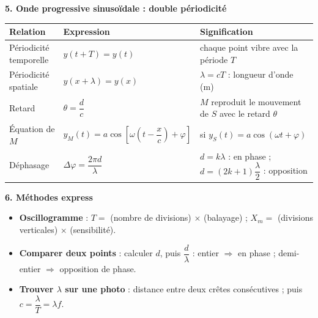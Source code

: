 \documentclass[11pt]{article}
\begin{document}
\begin{bilan}
\textbf{5. Onde progressive sinusoïdale : double périodicité}
\begin{center}
\begin{tabularx}{\linewidth}{|l|X|X|}\hline
\rowcolor{popblueL} \textbf{Relation} & \textbf{Expression} & \textbf{Signification} \\ \hline
Périodicité temporelle & $y(t+T)=y(t)$ & chaque point vibre avec la période $T$ \\ \hline
Périodicité spatiale & $y(x+\lambda)=y(x)$ & $\lambda=cT$ : longueur d'onde (m) \\ \hline
Retard & $\theta=\dfrac{d}{c}$ & $M$ reproduit le mouvement de $S$ avec le retard $\theta$ \\ \hline
Équation de $M$ & $y_M(t)=a\cos\left[\omega\left(t-\dfrac{x}{c}\right)+\varphi\right]$ & si $y_S(t)=a\cos(\omega t+\varphi)$ \\ \hline
Déphasage & $\Delta\varphi=\dfrac{2\pi d}{\lambda}$ & $d=k\lambda$ : en phase ; $d=(2k+1)\dfrac{\lambda}{2}$ : opposition \\ \hline
\end{tabularx}
\end{center}

\textbf{6. Méthodes express}
\begin{itemize}
  \item \textbf{Oscillogramme} : $T=$ (nombre de divisions) $\times$ (balayage) ; $X_m=$ (divisions verticales) $\times$ (sensibilité).
  \item \textbf{Comparer deux points} : calculer $d$, puis $\dfrac{d}{\lambda}$ : entier $\Rightarrow$ en phase ; demi-entier $\Rightarrow$ opposition de phase.
  \item \textbf{Trouver $\lambda$ sur une photo} : distance entre deux crêtes consécutives ; puis $c=\dfrac{\lambda}{T}=\lambda f$.
\end{itemize}
\end{bilan}
\end{document}
